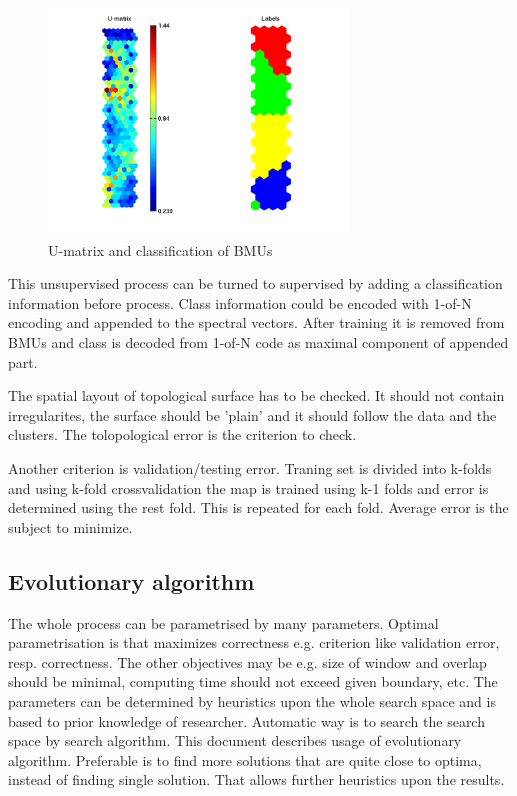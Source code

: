 \documentclass[a4paper,journal]{IEEEtran}
\begin{document}
\begin{figure}[h]
\includegraphics[width=80mm]{som_umat}
\caption{U-matrix and classification of BMUs}
\label{som_umat}
\end{figure}

This unsupervised process can be turned to supervised by adding a classification
information before process.
Class information  could be encoded with 1-of-N encoding and appended to the 
spectral vectors. After training it is removed from BMUs and class is 
decoded from 1-of-N code as maximal component of appended part.

The spatial 
layout of topological surface has to be checked. It should not contain irregularites, 
the surface should be 'plain' and it should follow the data and the clusters. 
The tolopological error is the criterion to check.

Another criterion is validation/testing error. Traning set is divided into k-folds
and using k-fold crossvalidation the map is trained using k-1 folds and  error 
is determined using the rest fold. This is repeated for each fold. Average error is 
the subject to minimize.


\subsection{Evolutionary algorithm}
The whole process can be parametrised by many parameters. Optimal parametrisation 
is that maximizes correctness e.g. criterion like validation error, resp. correctness.
The other objectives may be e.g. size of window and overlap
should be minimal, computing time should not exceed given boundary, etc.
The parameters can be determined by heuristics upon the whole search space and
is based to prior knowledge of researcher.
Automatic way is to search the search space by search algorithm. This document
describes usage of evolutionary algorithm.
Preferable is to find more solutions that are quite close to optima, instead of 
finding single solution. That allows further heuristics upon the results.
\end{document}
